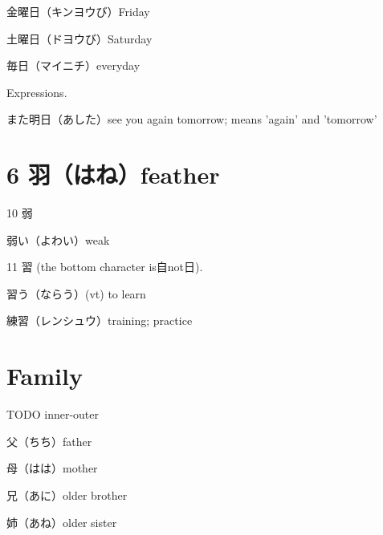 金曜日（キンヨウび）Friday

土曜日（ドヨウび）Saturday

毎日（マイニチ）everyday

Expressions.

また明日（あした）see you again tomorrow; means 'again' and 'tomorrow'

\section{6 羽（はね）feather}

10 弱

弱い（よわい）weak

11 習 (the bottom character is自not日).

習う（ならう）(vt) to learn

練習（レンシュウ）training; practice

\section{Family}

TODO inner-outer

父（ちち）father

母（はは）mother

兄（あに）older brother

姉（あね）older sister
